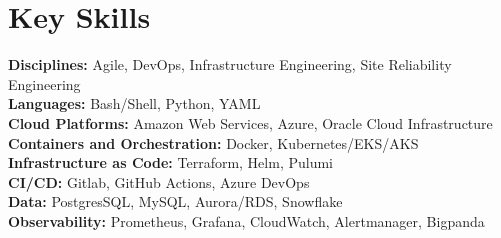 \documentclass[letterpaper,10.5pt]{article}
\makeatletter
\newcommand{\resumeItem}[1]{
  \item\small{
    {#1 \vspace{-2pt}}
  }
}
\newcommand{\resumeProjectHeading}[2]{
    \vspace{-2pt}\item
    \begin{tabular*}{0.97\textwidth}{l@{\extracolsep{\fill}}r}
      \small#1 & #2 \\
    \end{tabular*}\vspace{-7pt}
}
\newcommand{\resumeSubHeadingListStart}{\begin{itemize}[leftmargin=0.15in, label={}]}
\newcommand{\resumeSubHeadingListEnd}{\end{itemize}}
\newcommand{\resumeItemListStart}{\begin{itemize}}
\newcommand{\resumeItemListEnd}{\end{itemize}\vspace{-5pt}}
\makeatother
\begin{document}
\section{Key Skills}
  \vspace{2pt}
  \resumeSubHeadingListStart
    \small{\item{
        \textbf{Disciplines:}{ Agile, DevOps, Infrastructure Engineering, Site Reliability Engineering} \\ \vspace{3pt}
        \textbf{Languages:}{ Bash/Shell, Python, YAML} \\ \vspace{3pt}
        \textbf{Cloud Platforms:}{ Amazon Web Services, Azure, Oracle Cloud Infrastructure} \\ \vspace{3pt}
        \textbf{Containers and Orchestration:}{ Docker, Kubernetes/EKS/AKS } \\ \vspace{3pt}
        \textbf{Infrastructure as Code:}{ Terraform, Helm, Pulumi} \\ \vspace{3pt}
        \textbf{CI/CD:}{ Gitlab, GitHub Actions, Azure DevOps} \\ \vspace{3pt}
        \textbf{Data:}{ PostgresSQL, MySQL, Aurora/RDS, Snowflake} \\ \vspace{3pt}   
        \textbf{Observability:}{ Prometheus, Grafana, CloudWatch, Alertmanager, Bigpanda} \\ \vspace{3pt}
    }}
  \resumeSubHeadingListEnd



      
           
\end{document}
